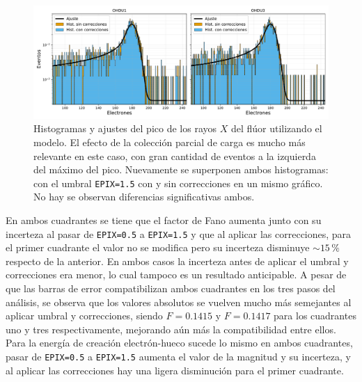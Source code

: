 \begin{figure}[h]
    \centering
    \includegraphics[scale=0.5]{Figs/F_hists_ohdu1y3_dobles.pdf}
    \caption{Histogramas y ajustes del pico de los rayos $X$ del flúor utilizando el modelo. El efecto de la colección parcial de carga es mucho más relevante en este caso, con gran cantidad de eventos a la izquierda del máximo del pico. Nuevamente se superponen ambos histogramas: con el umbral \texttt{EPIX=1.5} con y sin correcciones en un mismo gráfico. No hay se observan diferencias significativas ambos.}
    \label{fig:F_OHDU1y3_EPIX15conCorr}
\end{figure}
En ambos cuadrantes se tiene que el factor de Fano aumenta junto con su incerteza al pasar de \verb|EPIX=0.5| a \verb|EPIX=1.5| y que al aplicar las correcciones, para el primer cuadrante el valor no se modifica pero su incerteza disminuye $\sim 15\,\%$ respecto de la anterior. En ambos casos la incerteza antes de aplicar el umbral y correcciones era menor, lo cual tampoco es un resultado anticipable. A pesar de que las barras de error compatibilizan ambos cuadrantes en los tres pasos del análisis, se observa que los valores absolutos se vuelven mucho más semejantes al aplicar umbral y correcciones, siendo $F=0.1415$ y $F=0.1417$ para los cuadrantes uno y tres respectivamente, mejorando aún más la compatibilidad entre ellos. Para la energía de creación electrón-hueco sucede lo mismo en ambos cuadrantes, pasar de \verb|EPIX=0.5| a \verb|EPIX=1.5| aumenta el valor de la magnitud y su incerteza, y al aplicar las correcciones hay una ligera disminución para el primer cuadrante. 

